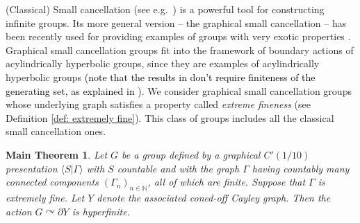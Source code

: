 \documentclass{article}[11pt]
\newcommand{\N}{\mathbb{N}}
\newtheorem*{mainthm}{Main Theorem}
\newcommand{\DO}[1]{{\textcolor{green}{{\bf Damian:}{\small {~#1~}}}}}
\newcommand{\KO}[1]{{\textcolor{red}{{\bf Koichi:}{\small {~#1~}}}}}
\begin{document}
(Classical) Small cancellation (see e.g.\ \cite{MR1086661}) is a powerful tool for constructing infinite groups. Its more general version -- the graphical small cancellation -- has been recently used for providing examples of groups with very exotic properties \cite{OsajdaMonsters,Osajda,Small_Cancellation_Burnside}.
Graphical small cancellation groups fit into the framework of boundary actions of acylindrically hyperbolic groups, since they are examples of acylindrically hyperbolic groups \cite{Gruber_Sisto} \textcolor{black}{(note that the results in \cite{Gruber_Sisto} don't require finiteness of the generating set, as explained in \cite{GruberPhDThesis})}. %
We consider graphical small cancellation groups whose underlying graph satisfies a property called \emph{extreme fineness} (see Definition \ref{def: extremely fine}). This class of groups includes all the classical small cancellation ones. %


\begin{mainthm}
    
    Let $G$ be a group defined by a graphical $C'(1/10)$ presentation $\langle S \vert \Gamma \rangle$ with $S$ countable and with the graph $\Gamma$ having countably many connected components $(\Gamma_n)_{n \in \N}$, all of which are finite. Suppose that $\Gamma$ is extremely fine. Let $Y$ denote the associated coned-off Cayley graph. Then the action $G \curvearrowright \partial Y$ is hyperfinite. 
\end{mainthm}
\end{document}
